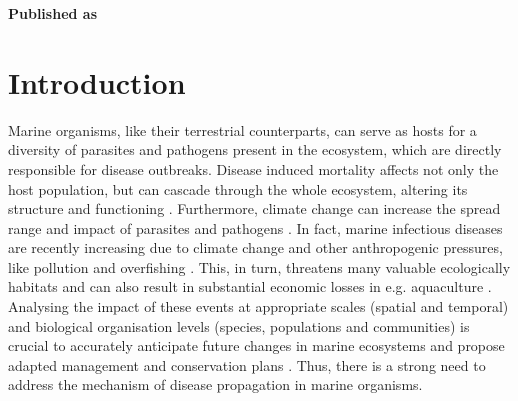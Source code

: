 \vspace{3cm}





\textbf{Published as}

\vspace{0.5cm}


\newpage
\section{Introduction}\label{sec:Introduction_Nacras_I}

Marine organisms, like their terrestrial counterparts, can serve as hosts
for a diversity of parasites and pathogens present in the ecosystem, which are
directly responsible for disease outbreaks. Disease induced mortality affects
not only the host population, but can cascade through the whole ecosystem,
altering its structure and functioning \cite{Ward2004}. Furthermore, climate
change can increase the spread range and impact of parasites and pathogens
\cite{Burge2014}. In fact, marine infectious diseases are recently increasing
due to climate change and other anthropogenic pressures, like pollution and
overfishing \cite{Lafferty2004}. This, in turn, threatens many valuable
ecologically habitats and can also result in substantial economic losses in
e.g. aquaculture \cite{Lafferty2015}. Analysing the impact of these events at
appropriate scales (spatial and temporal) and biological organisation levels
(species, populations and communities) is crucial to accurately anticipate
future changes in marine ecosystems and propose adapted management and
conservation plans \cite{Pairaud2014}. Thus, there is a strong need to address
the mechanism of disease propagation in marine organisms.

